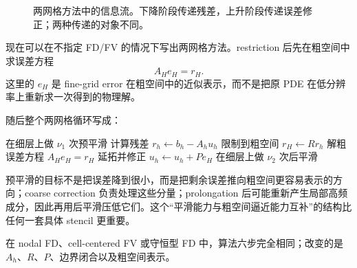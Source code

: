 \begin{figure}[htbp]
\centering
{}
\caption{两网格方法中的信息流。下降阶段传递残差，上升阶段传递误差修正；两种传递的对象不同。}
\label{fig:twogrid-information-flow}
\end{figure}

现在可以在不指定 FD/FV 的情况下写出两网格方法。restriction 后先在粗空间中求误差方程
\begin{equation}
A_He_H=r_H.
\label{eq:coarse_error_eq}
\end{equation}
这里的 $e_H$ 是 fine-grid error 在粗空间中的近似表示，而不是把原 PDE 在低分辨率上重新求一次得到的物理解。

随后整个两网格循环写成：
\begin{algorithm}[htbp]
\caption{Two-grid correction}
\begin{algorithmic}[1]
\State 在细层上做 $\nu_1$ 次预平滑
\State 计算残差 $r_h\gets b_h-A_hu_h$
\State 限制到粗空间 $r_H\gets Rr_h$
\State 解粗误差方程 $A_He_H=r_H$
\State 延拓并修正 $u_h\gets u_h+Pe_H$
\State 在细层上做 $\nu_2$ 次后平滑
\end{algorithmic}
\end{algorithm}

预平滑的目标不是把误差降到很小，而是把剩余误差推向粗空间更容易表示的方向；coarse correction 负责处理这些分量；prolongation 后可能重新产生局部高频成分，因此再用后平滑压低它们。这个“平滑能力与粗空间逼近能力互补”的结构比任何一套具体 stencil 更重要。

在 nodal FD、cell-centered FV 或守恒型 FD 中，算法六步完全相同；改变的是 $A_h$、$R$、$P$、边界闭合以及粗空间表示。

